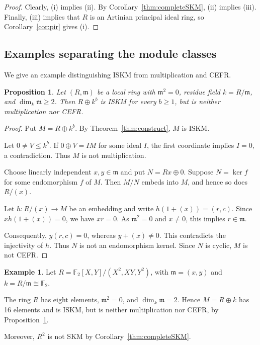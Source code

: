 \documentclass[11pt,a4paper]{article}
\newtheorem{proposition}[theorem]{Proposition}
\theoremstyle{definition}
\newtheorem{example}[theorem]{Example}
\theoremstyle{remark}
\begin{document}
\begin{proof}
Clearly, (i) implies (ii). By Corollary~\ref{thm:completeSKM}, (ii) implies (iii). Finally, (iii) implies that $R$ is an Artinian principal ideal ring, so Corollary~\ref{cor:pir} gives (i).
\end{proof}


\subsection{Examples separating the module classes}

We give an example distinguishing ISKM from multiplication and CEFR.

\begin{proposition}
\label{prop:noncefr}
Let $(R,\mathfrak m)$ be a local ring with
$\mathfrak m^2=0$, residue field $k=R/\mathfrak m$,
and $\dim_k\mathfrak m\geq2$.
Then $R\oplus k^b$ is ISKM for every $b\geq1$,
but is neither multiplication nor CEFR.
\end{proposition}

\begin{proof}
Put $M=R\oplus k^b$. By Theorem~\ref{thm:construct},
$M$ is ISKM.

Let $0\ne V\leq k^b$. If $0\oplus V=IM$ for some
ideal $I$, the first coordinate implies $I=0$,
a contradiction. Thus $M$ is not multiplication.

Choose linearly independent $x,y\in\mathfrak m$
and put $N=Rx\oplus0$. Suppose $N=\ker f$ for
some endomorphism $f$ of $M$. Then $M/N$ embeds
into $M$, and hence so does $R/(x)$.

Let $h:R/(x)\to M$ be an embedding and write
$h(1+(x))=(r,c)$. Since $xh(1+(x))=0$,
we have $xr=0$. As $\mathfrak m^2=0$ and
$x\ne0$, this implies $r\in\mathfrak m$.

Consequently, $y(r,c)=0$, whereas
$y+(x)\ne0$. This contradicts the injectivity
of $h$. Thus $N$ is not an endomorphism kernel.
Since $N$ is cyclic, $M$ is not CEFR.
\end{proof}

\begin{example}
Let $R=\mathbb F_2[X,Y]/(X^2,XY,Y^2)$,
with $\mathfrak m=(x,y)$ and
$k=R/\mathfrak m\cong\mathbb F_2$.

The ring $R$ has eight elements,
$\mathfrak m^2=0$, and $\dim_k\mathfrak m=2$.
Hence $M=R\oplus k$ has 16 elements and
is ISKM, but is neither multiplication
nor CEFR, by Proposition~\ref{prop:noncefr}.

Moreover, $R^2$ is not SKM by
Corollary~\ref{thm:completeSKM}.
\end{example}
\end{document}

